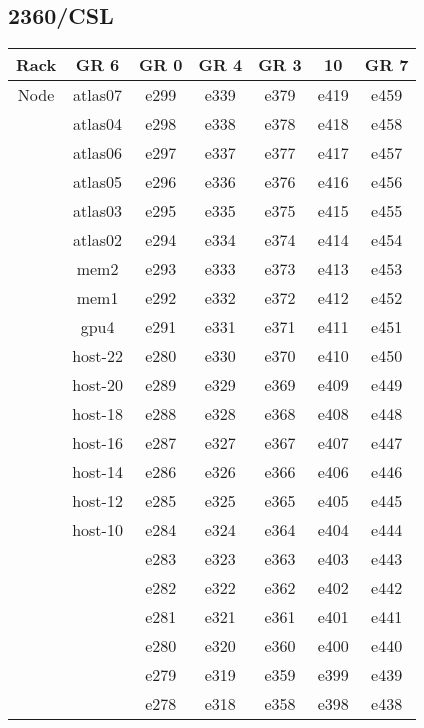 \documentclass[10pt,letterpaper]{article}
\begin{document}
    \subsection{2360/CSL}
        \begin{center}
        \begin{tabular}{ |c|c|c|c|c|c|c| }
        \hline
        Rack & GR 6 & GR 0 & GR 4 & GR 3 & 10 & GR 7 \\
        \hline
        \multirow{1}{3em}{Node}

        & atlas07 & e299 & e339 & e379 & e419 & e459 \\
        & atlas04 & e298 & e338 & e378 & e418 & e458 \\
        & atlas06 & e297 & e337 & e377 & e417 & e457 \\
        & atlas05 & e296 & e336 & e376 & e416 & e456 \\
        & atlas03 & e295 & e335 & e375 & e415 & e455 \\
        & atlas02 & e294 & e334 & e374 & e414 & e454 \\
        & mem2    & e293 & e333 & e373 & e413 & e453 \\
        & mem1    & e292 & e332 & e372 & e412 & e452 \\
        & gpu4    & e291 & e331 & e371 & e411 & e451 \\
        & host-22 & e280 & e330 & e370 & e410 & e450 \\
        & host-20 & e289 & e329 & e369 & e409 & e449 \\
        & host-18 & e288 & e328 & e368 & e408 & e448 \\
        & host-16 & e287 & e327 & e367 & e407 & e447 \\
        & host-14 & e286 & e326 & e366 & e406 & e446 \\
        & host-12 & e285 & e325 & e365 & e405 & e445 \\
        & host-10 & e284 & e324 & e364 & e404 & e444 \\
        &         & e283 & e323 & e363 & e403 & e443 \\
        &         & e282 & e322 & e362 & e402 & e442 \\
        &         & e281 & e321 & e361 & e401 & e441 \\
        &         & e280 & e320 & e360 & e400 & e440 \\
        &         & e279 & e319 & e359 & e399 & e439 \\
        &         & e278 & e318 & e358 & e398 & e438 \\

\end{tabular}
\end{center}
\end{document}
